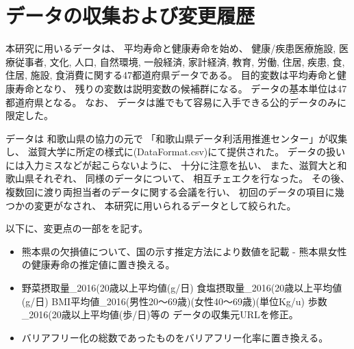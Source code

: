 \chapter{データの収集および変更履歴}


本研究に用いるデータは、
平均寿命と健康寿命を始め、
 健康/疾患医療施設, 医療従事者, 文化, 人口, 自然環境, 一般経済, 家計経済, 教育, 労働, 住居, 疾患, 食, 住居, 施設, 食消費に関する47都道府県データである。
目的変数は平均寿命と健康寿命となり、
残りの変数は説明変数の候補群になる。
データの基本単位は47都道府県となる。
なお、
データは誰でもて容易に入手できる公的データのみに限定した。


データは
和歌山県の協力の元で
「和歌山県データ利活用推進センター」が収集し、
滋賀大学に所定の様式に(DataFormat.csv)にて提供された。
データの扱いには入力ミスなどが起こらないように、
十分に注意を払い、
また、滋賀大と和歌山県それぞれ、
同様のデータについて、
相互チェエクを行なった。
その後、複数回に渡り両担当者のデータに関する会議を行い、
初回のデータの項目に幾つかの変更がなされ、
本研究に用いられるデータとして絞られた。

以下に、変更点の一部をを記す。
\begin{itemize}
	\item 
		熊本県の欠損値について、国の示す推定方法により数値を記載 -
熊本県女性の健康寿命の推定値に置き換える。

\item
野菜摂取量\_2016(20歳以上平均値(g/日)
食塩摂取量\_2016(20歳以上平均値(g/日)
BMI平均値\_2016(男性20〜69歳)(女性40〜69歳)(単位Kg/u)
歩数\_2016(20歳以上平均値(歩/日)等の
データの収集元URLを修正。


%

\item

バリアフリー化の総数であったものをバリアフリー化率に置き換える。
%
%

\end{itemize}



